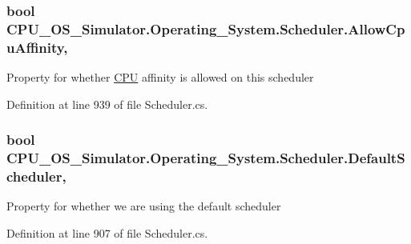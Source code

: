 \subsubsection[{Allow\+Cpu\+Affinity}]{\setlength{\rightskip}{0pt plus 5cm}bool C\+P\+U\+\_\+\+O\+S\+\_\+\+Simulator.\+Operating\+\_\+\+System.\+Scheduler.\+Allow\+Cpu\+Affinity\hspace{0.3cm}{\ttfamily [get]}, {\ttfamily [set]}}\label{class_c_p_u___o_s___simulator_1_1_operating___system_1_1_scheduler_a904a19345a3ceffa809aac3e0ad06321}


Property for whether \hyperlink{namespace_c_p_u___o_s___simulator_1_1_c_p_u}{C\+P\+U} affinity is allowed on this scheduler 



Definition at line 939 of file Scheduler.\+cs.

\hypertarget{class_c_p_u___o_s___simulator_1_1_operating___system_1_1_scheduler_acef6087d200a91657055a533ac0e3474}{}
\subsubsection[{Default\+Scheduler}]{\setlength{\rightskip}{0pt plus 5cm}bool C\+P\+U\+\_\+\+O\+S\+\_\+\+Simulator.\+Operating\+\_\+\+System.\+Scheduler.\+Default\+Scheduler\hspace{0.3cm}{\ttfamily [get]}, {\ttfamily [set]}}\label{class_c_p_u___o_s___simulator_1_1_operating___system_1_1_scheduler_acef6087d200a91657055a533ac0e3474}


Property for whether we are using the default scheduler 



Definition at line 907 of file Scheduler.\+cs.

\hypertarget{class_c_p_u___o_s___simulator_1_1_operating___system_1_1_scheduler_a576004ed0b656a08a0d34d6b1b4d7f07}{}

